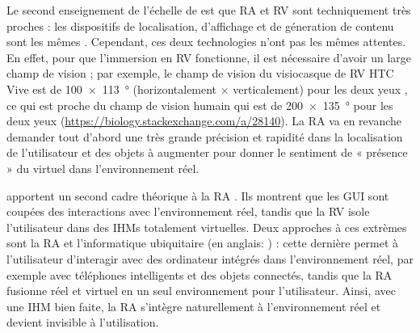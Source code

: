 Le second enseignement de l'échelle de \citeauthor{Milgram1994} est que RA et RV sont techniquement très proches : les dispositifs de localisation, d'affichage et de géneration de contenu sont les mêmes \citep{Billinghurst2015}. Cependant, ces deux technologies n'ont pas les mêmes attentes. En effet, pour que l'immersion en RV fonctionne, il est nécessaire d'avoir un large champ de vision ; par exemple, le champ de vision du visiocasque de RV HTC Vive est de \SI{100x113}{\degree} (horizontalement $\times$ verticalement) pour les deux yeux \citep{Kreylos2016}, ce qui est proche du champ de vision humain qui est de \SI{200x135}{\degree} pour les deux yeux (\url{https://biology.stackexchange.com/a/28140}). La RA va en revanche demander tout d'abord une très grande précision et rapidité dans la localisation de l'utilisateur et des objets à augmenter pour donner le sentiment de « présence » du virtuel dans l'environnement réel.


\cite{Rekimoto1995} apportent un second cadre théorique à la RA . Ils montrent que les GUI sont coupées des interactions avec l'environnement réel, tandis que la RV isole l'utilisateur dans des IHMs totalement virtuelles. Deux approches à ces extrèmes sont la RA et l'informatique ubiquitaire (en anglais: ) : cette dernière permet à l'utilisateur d'interagir avec des ordinateur intégrés dans l'environnement réel, par exemple avec téléphones intelligents et des objets connectés, tandis que la RA fusionne réel et virtuel en un seul environnement pour l'utilisateur. Ainsi, avec une IHM bien faite, la RA s'intègre naturellement à l'environnement réel et devient invisible à l'utilisation.

